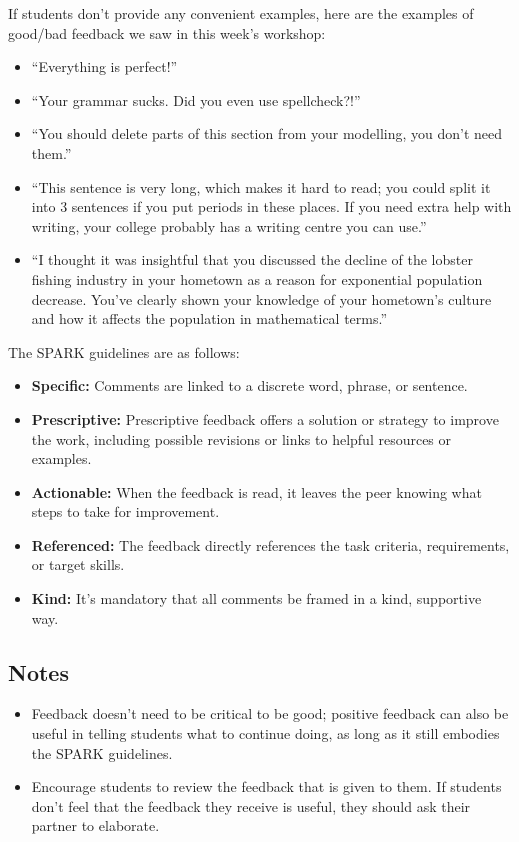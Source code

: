 	If students don't provide any convenient examples, here are the examples of good/bad feedback we saw in this week's workshop:
	\begin{itemize}
		\item ``Everything is perfect!''
		\item ``Your grammar sucks. Did you even use spellcheck?!''
		\item ``You should delete parts of this section from your modelling, you don't need them.''
		\item ``This sentence is very long, which makes it hard to read; you could split it into 3 sentences if you put periods in these places. If you need extra help with writing, your college probably has a writing centre you can use.''
		\item ``I thought it was insightful that you discussed the decline of the lobster fishing industry in your hometown as a reason for exponential population decrease. You've clearly shown your knowledge of your hometown's culture and how it affects the population in mathematical terms.''
	\end{itemize}
	
	The SPARK guidelines are as follows:
	\begin{itemize}
		\item \textbf{Specific:} Comments are linked to a discrete word, phrase, or sentence.
		\item \textbf{Prescriptive:} Prescriptive feedback offers a solution or strategy to improve the work, including possible revisions or links to helpful resources or examples.
		\item \textbf{Actionable:} When the feedback is read, it leaves the peer knowing what steps to take for improvement.
		\item \textbf{Referenced:} The feedback directly references the task criteria, requirements, or target skills.
		\item \textbf{Kind:} It's mandatory that all comments be framed in a kind, supportive way.
	\end{itemize}
	
	

\subsection*{Notes}
	\begin{itemize}
		\item Feedback doesn't need to be critical to be good; positive feedback can also be useful in telling students what to continue doing, as long as it still embodies the SPARK guidelines.
		\item Encourage students to review the feedback that is given to them. If students don't feel that the feedback they receive is useful, they should ask their partner to elaborate.

\end{itemize}
	
